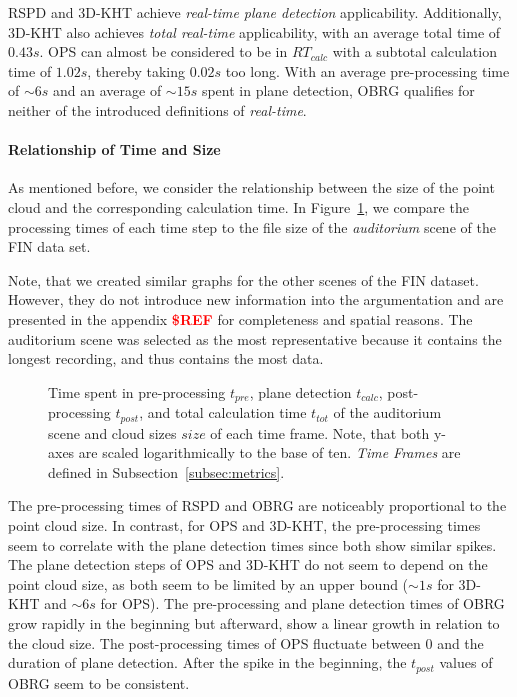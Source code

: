 \documentclass[main.tex]{subfiles}
\begin{document}
RSPD and 3D-KHT achieve \textit{real-time plane detection} applicability. Additionally, 3D-KHT also achieves \textit{total real-time} applicability,
with an average total time of $0.43s$. OPS can almost be considered to be in $RT_{calc}$ with a subtotal
calculation time of $1.02s$, thereby taking $0.02s$ too long.
With an average pre-processing time of ${\sim}6s$ and an average of ${\sim}15s$ spent in plane detection, OBRG qualifies for 
neither of the introduced definitions of \textit{real-time}.


\paragraph{Relationship of Time and Size}
As mentioned before, we consider the relationship between the size of the point cloud and the corresponding calculation time.
In Figure~\ref{fig:dynaudi}, we compare the processing times of each time step to the file size of the
\textit{auditorium} scene of the FIN data set.

Note, that we created similar graphs for the other scenes of the FIN dataset.
However, they do not introduce new information into the argumentation and are presented in the appendix \textbf{\textcolor{red}{\$REF}} for completeness
and spatial reasons.
The auditorium scene was selected as the most representative because it contains the longest
recording, and thus contains the most data.

\begin{figure}[H]
    \centering
    \def\svgwidth{0.9\textwidth}
    
    \caption[Time Results Auditorium]{Time spent in pre-processing $t_{pre}$, plane detection $t_{calc}$, post-processing
        $t_{post}$, and total calculation time $t_{tot}$ of the auditorium scene and cloud sizes $size$ of each time frame.
        Note, that both y-axes are scaled logarithmically to the base of ten. \textit{Time Frames} are defined in Subsection~\ref{subsec:metrics}.}
    \label{fig:dynaudi}
\end{figure}
The pre-processing times of RSPD and OBRG are noticeably proportional to the point cloud size.
In contrast, for OPS and 3D-KHT, the pre-processing times seem to correlate with the plane detection times since
both show similar spikes. The plane detection steps of OPS and 3D-KHT do not seem to depend on the point cloud size,
as both seem to be limited by an upper bound (${\sim}1s$ for 3D-KHT and ${\sim}6s$ for OPS). The pre-processing and plane detection times of OBRG grow rapidly in the
beginning but afterward, show a linear growth in relation to the cloud size. The post-processing times of OPS fluctuate
between 0 and the duration of plane detection. After the spike in the beginning, the $t_{post}$ values of OBRG seem to be
consistent.
\end{document}
